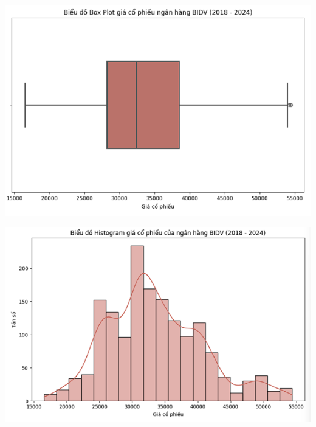 \documentclass[conference]{IEEEtran}
\begin{document}
\begin{minipage}{0.21\textwidth}
    \centering
    \includegraphics[width=\linewidth]{images/Statistic/bidv_boxplot.png}
    \label{fig:image1}
\end{minipage}
\hfill
\begin{minipage}{0.21\textwidth}
    \centering
    \includegraphics[width=\linewidth]{images/Statistic/bidv_histogram.png}
    \label{fig:image2}
\end{minipage}
\end{document}
